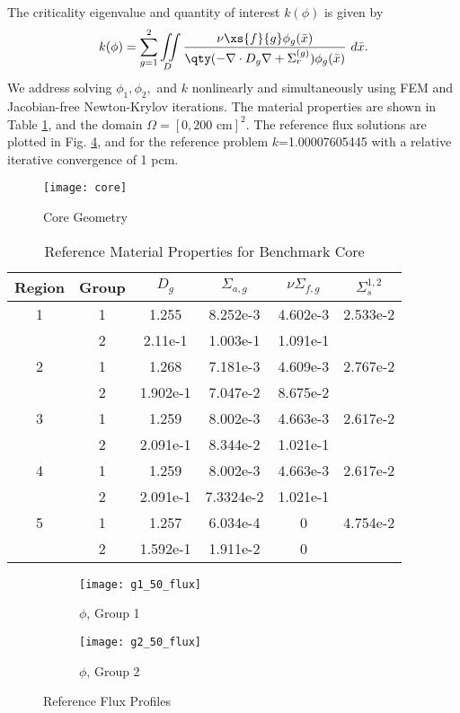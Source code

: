 \\
The criticality eigenvalue and quantity of interest $k(\phi)$ is given by
\begin{equation}
k(\phi)=\sum_{g=1}^2\iint\limits_D\frac{\nu\xs{f}{g}\phi_g(\bar x)}{\qty(-\nabla\cdot D_g\nabla+\Sigma_r^{(g)})\phi_g(\bar x)}~d\bar x.
\end{equation}
We address solving $\phi_1,\phi_2,$ and $k$ nonlinearly and simultaneously using FEM and Jacobian-free
Newton-Krylov iterations.  
The material properties are shown in Table \ref{tab:coremats}, and the domain $\Omega=[0,200\text{ cm}]^2$.
The reference flux solutions are plotted in Fig. \ref{benchflux}, and for the reference problem
$k$=1.00007605445 with a relative iterative convergence of 1 pcm.  \begin{figure}[H]
\centering
  \texttt{[image: core]}
  \caption{Core Geometry}
  \label{geom}
\end{figure}
\begin{table}[h]
\centering
\begin{tabular}{c c | c c c c}
Region & Group & $D_g$ & $\Sigma_{a,g}$ & $\nu\Sigma_{f,g}$ & $\Sigma_s^{1,2}$ \\ \hline
1 & 1 & 1.255 & 8.252e-3 & 4.602e-3 & 2.533e-2 \\
 & 2 & 2.11e-1 & 1.003e-1 & 1.091e-1 & \\ \hline
2 & 1 & 1.268 & 7.181e-3 & 4.609e-3 & 2.767e-2 \\
 & 2 & 1.902e-1 & 7.047e-2 & 8.675e-2 & \\ \hline
3 & 1 & 1.259 & 8.002e-3 & 4.663e-3 & 2.617e-2 \\
 & 2 & 2.091e-1 & 8.344e-2 & 1.021e-1 & \\ \hline
4 & 1 & 1.259 & 8.002e-3 & 4.663e-3 & 2.617e-2 \\
 & 2 & 2.091e-1 & 7.3324e-2 & 1.021e-1 & \\ \hline
5 & 1 & 1.257 & 6.034e-4 & 0 & 4.754e-2 \\
 & 2 & 1.592e-1 & 1.911e-2 & 0 & 
\end{tabular}
\caption{Reference Material Properties for Benchmark Core}
\label{tab:coremats}
\end{table}
\begin{figure}[H]
\centering
  \begin{subfigure}[b]{0.45 \textwidth}
   \texttt{[image: g1\_50\_flux]}
   \caption{$\phi$, Group 1}
   \label{g1}
  \end{subfigure}
  \begin{subfigure}[b]{0.45 \textwidth}
   \texttt{[image: g2\_50\_flux]}
   \caption{$\phi$, Group 2}
   \label{g2}
  \end{subfigure}
  \caption{Reference Flux Profiles}
  \label{benchflux}
\end{figure}
